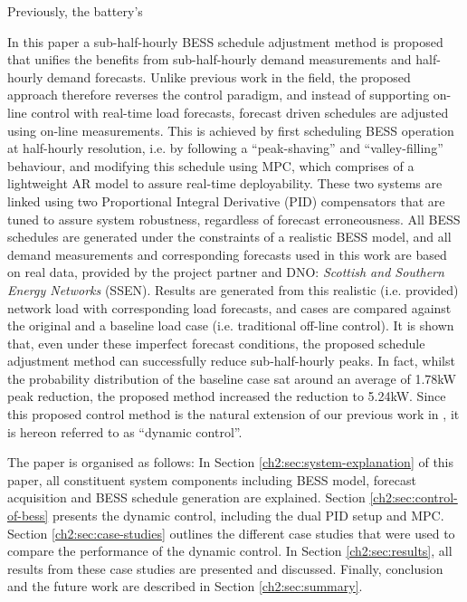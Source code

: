 Previously, the battery's 

In this paper a sub-half-hourly BESS schedule adjustment method is proposed that unifies the benefits from sub-half-hourly demand measurements and half-hourly demand forecasts.
Unlike previous work in the field, the proposed approach therefore reverses the control paradigm, and instead of supporting on-line control with real-time load forecasts, forecast driven schedules are adjusted using on-line measurements.
This is achieved by first scheduling BESS operation at half-hourly resolution, i.e. by following a ``peak-shaving'' and ``valley-filling'' behaviour, and modifying this schedule using MPC, which comprises of a lightweight AR model to assure real-time deployability.
These two systems are linked using two Proportional Integral Derivative (PID) compensators that are tuned to assure system robustness, regardless of forecast erroneousness.
All BESS schedules are generated under the constraints of a realistic BESS model, and all demand measurements and corresponding forecasts used in this work are based on real data, provided by the project partner and DNO: \textit{Scottish and Southern Energy Networks} (SSEN).
Results are generated from this realistic (i.e. provided) network load with corresponding load forecasts, and cases are compared against the original and a baseline load case (i.e. traditional off-line control).
It is shown that, even under these imperfect forecast conditions, the proposed schedule adjustment method can successfully reduce sub-half-hourly peaks.
In fact, whilst the probability distribution of the baseline case sat around an average of 1.78kW peak reduction, the proposed method increased the reduction to 5.24kW.
Since this proposed control method is the natural extension of our previous work in \cite{Zangs2016}, it is hereon referred to as ``dynamic control''.

The paper is organised as follows:
In Section \ref{ch2:sec:system-explanation} of this paper, all constituent system components including BESS model, forecast acquisition and BESS schedule generation are explained.
Section \ref{ch2:sec:control-of-bess} presents the dynamic control, including the dual PID setup and MPC.
Section \ref{ch2:sec:case-studies} outlines the different case studies that were used to compare the performance of the dynamic control.
In Section \ref{ch2:sec:results}, all results from these case studies are presented and discussed.
Finally, conclusion and the future work are described in Section \ref{ch2:sec:summary}.










